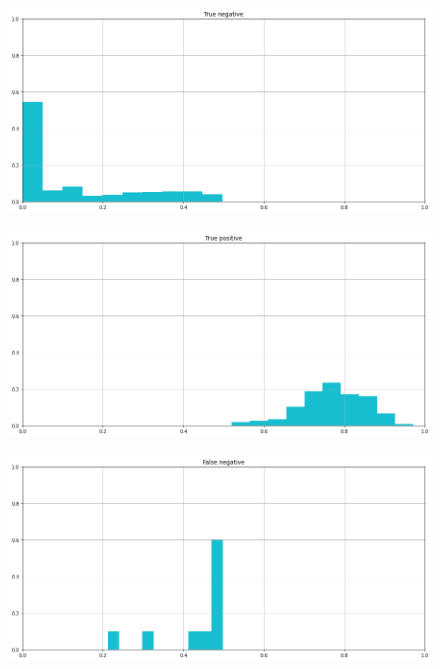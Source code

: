 \documentclass[12pt]{report}
\theoremstyle{definition}
\begin{document}
\begin{figure}
\centering
    \begin{minipage}{0.48\textwidth}
     \includegraphics[width=\linewidth]{images/experiment_beta05_disgiunti/tn.png}\label{tn_b05d}
   \end{minipage}
   \begin{minipage}{0.48\textwidth}
     \includegraphics[width=\linewidth]{images/experiment_beta05_disgiunti/tp.png}\label{tp_b05d}
   \end{minipage}
   \begin{minipage}{0.48\textwidth}
     \includegraphics[width=\linewidth]{images/experiment_beta05_disgiunti/fn.png}\label{fn_b05d}
   \end{minipage}

\end{figure}
\end{document}
